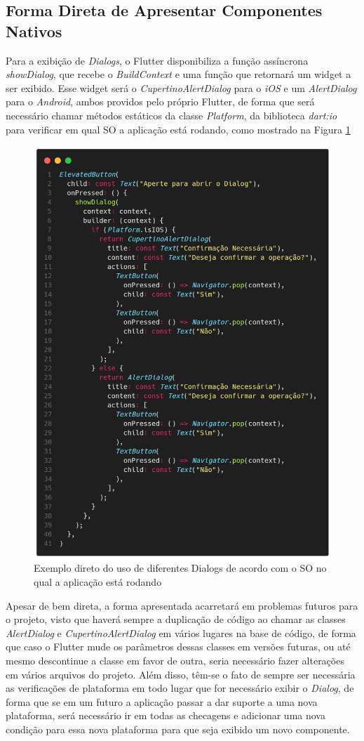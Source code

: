 \documentclass[12pt, %
openright, 
oneside, %
a4paper,    %
brazil]{facom-ufu-abntex2}
\begin{document}
\subsection{Forma Direta de Apresentar Componentes Nativos}

Para a exibição de \textit{Dialogs}, o Flutter disponibiliza a função assíncrona \textit{showDialog}, que recebe o \textit{BuildContext} e uma função que retornará um widget a ser exibido. Esse widget será o \textit{CupertinoAlertDialog} para o \textit{iOS} e um \textit{AlertDialog} para o \textit{Android}, ambos providos pelo próprio Flutter, de forma que será necessário chamar métodos estáticos da classe \textit{Platform}, da biblioteca \textit{dart:io} para verificar em qual SO a aplicação está rodando, como mostrado na Figura \ref{fig:adhoc_dialog}

\begin{figure}[ht]
    \centering
    \includegraphics[width=.65\textwidth, trim={0 30 0 100}, clip]{figures/dialog/adhoc_dialog.png}
    \caption{Exemplo direto do uso de diferentes Dialogs de acordo com o SO no qual a aplicação está rodando}
    \label{fig:adhoc_dialog}
\end{figure}

Apesar de bem direta, a forma apresentada acarretará em problemas futuros para o projeto, visto que haverá sempre a duplicação de código ao chamar as classes \textit{AlertDialog} e \textit{CupertinoAlertDialog} em vários lugares na base de código, de forma que caso o Flutter mude os parâmetros dessas classes em versões futuras, ou até mesmo descontinue a classe em favor de outra, seria necessário fazer alterações em vários arquivos do projeto. Além disso, têm-se o fato de sempre ser necessária as verificações de plataforma em todo lugar que for necessário exibir o \textit{Dialog}, de forma que se em um futuro a aplicação passar a dar suporte a uma nova plataforma, será necessário ir em todas as checagens e adicionar uma nova condição para essa nova plataforma para que seja exibido um novo componente.
\end{document}
